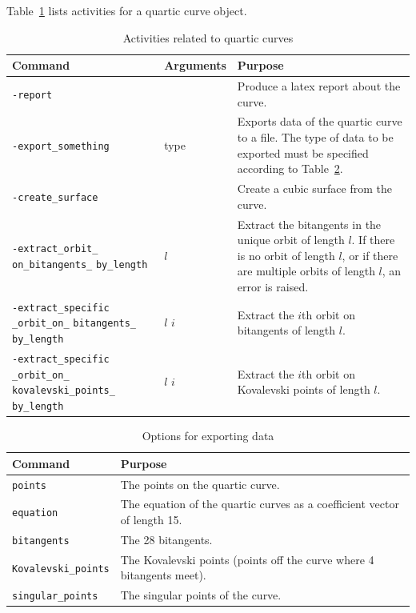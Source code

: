 \bigskip
Table~\ref{tab:quartic:curves:activities} lists activities for a quartic curve object.
\begin{table}
\begin{center}
\begin{tabular}{|p{4cm}|p{3cm}|p{8cm}|}
\hline
Command & Arguments & Purpose \\
\hline
\hline
\verb'-report' & & Produce a latex report about the curve. \\
\hline
\verb'-export_something' & type & Exports data of the quartic curve to a file. The type of data to be exported must be specified according to Table~\ref{tab:quartic:curve:export}. \\
\hline
\verb'-create_surface' & & Create a cubic surface from the curve. \\
\hline
\verb'-extract_orbit_' \verb'on_bitangents_' \verb'by_length' & $l$ & Extract the bitangents in the unique orbit of length $l$. If there is no orbit of length $l$, or if there are multiple orbits of length $l$, an error is raised. \\
\hline
\verb'-extract_specific' \verb'_orbit_on_' \verb'bitangents_' \verb'by_length' & $l$ $i$ & Extract the $i$th orbit on bitangents of length $l$. \\
\hline
\verb'-extract_specific' \verb'_orbit_on_' \verb'kovalevski_points_' \verb'by_length' & $l$ $i$ & Extract the $i$th orbit on Kovalevski points of length $l$. \\
\hline
\end{tabular}
\end{center}
\caption{\label{tab:quartic:curves:activities}Activities related to quartic curves}
\end{table}


\begin{table}
\begin{center}
\begin{tabular}{|p{4cm}|p{8cm}|}
\hline
Command  & Purpose \\
\hline
\hline
\verb'points' & The points on the quartic curve. \\
\hline
\verb'equation' & The equation of the quartic curves as a coefficient vector of length 15. \\
\hline
\verb'bitangents' & The 28 bitangents. \\
\hline
\verb'Kovalevski_points' & The Kovalevski points (points off the curve where 4 bitangents meet). \\
\hline
\verb'singular_points' & The singular points of the curve. \\
\hline
\end{tabular}
\end{center}
\caption{\label{tab:quartic:curve:export}Options for exporting data}
\end{table}




